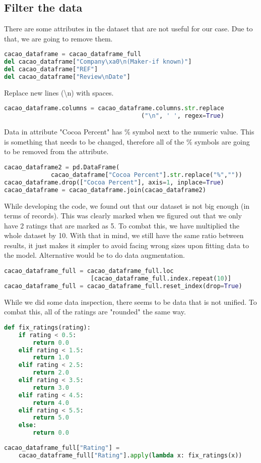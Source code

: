 \subsection{Filter the data}

There are some attributes in the dataset that are not useful for our case. Due to that, we are going to remove them.
\begin{lstlisting}[language=Python, caption=Remove attributes]
cacao_dataframe = cacao_dataframe_full
del cacao_dataframe["Company\xa0\n(Maker-if known)"]
del cacao_dataframe["REF"]
del cacao_dataframe["Review\nDate"]
\end{lstlisting}
Replace new lines (\textbackslash n) with spaces.
\begin{lstlisting}[language=Python, caption=Remove spaces]
cacao_dataframe.columns = cacao_dataframe.columns.str.replace
                                      ("\n", ' ', regex=True) 
\end{lstlisting}
Data in attribute "Cocoa Percent" has \% symbol next to the numeric value. This is something that needs to be changed, therefore all of the \% symbols are going to be removed from the attribute. 
\begin{lstlisting}[language=Python, caption=Remove symbols]
cacao_dataframe2 = pd.DataFrame(
             cacao_dataframe["Cocoa Percent"].str.replace("%",""))
cacao_dataframe.drop(["Cocoa Percent"], axis=1, inplace=True)
cacao_dataframe = cacao_dataframe.join(cacao_dataframe2)
\end{lstlisting}
While developing the code, we found out that our dataset is not big enough (in terms of records). This was clearly marked when we figured out that we only have 2 ratings that are marked as 5. To combat this, we have multiplied the whole dataset by 10. With that in mind, we still have the same ratio between results, it just makes it simpler to avoid facing wrong sizes upon fitting data to the model. Alternative would be to do data augmentation.
\begin{lstlisting}[language=Python, caption=Expend data]
cacao_dataframe_full = cacao_dataframe_full.loc
                        [cacao_dataframe_full.index.repeat(10)]
cacao_dataframe_full = cacao_dataframe_full.reset_index(drop=True)
\end{lstlisting}
While we did some data inspection, there seems to be data that is not unified. To combat this, all of the ratings are "rounded" the same way.
\begin{lstlisting}[language=Python, caption=Fix ratings]
def fix_ratings(rating):
    if rating < 0.5: 
        return 0.0 
    elif rating < 1.5: 
        return 1.0 
    elif rating < 2.5: 
        return 2.0
    elif rating < 3.5: 
        return 3.0
    elif rating < 4.5: 
        return 4.0 
    elif rating < 5.5: 
        return 5.0
    else:
        return 0.0
  
cacao_dataframe_full["Rating"] = 
    cacao_dataframe_full["Rating"].apply(lambda x: fix_ratings(x))
\end{lstlisting}